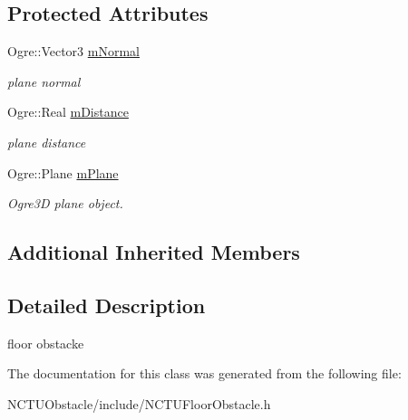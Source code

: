 \subsection*{Protected Attributes}
\begin{DoxyCompactItemize}
\item 
Ogre\+::\+Vector3 \hyperlink{class_n_c_t_u_1_1_floor_obstacle_a1e67d672c9203daf792e43a02892178f}{m\+Normal}\hypertarget{class_n_c_t_u_1_1_floor_obstacle_a1e67d672c9203daf792e43a02892178f}{}\label{class_n_c_t_u_1_1_floor_obstacle_a1e67d672c9203daf792e43a02892178f}

\begin{DoxyCompactList}\small\item\em plane normal \end{DoxyCompactList}\item 
Ogre\+::\+Real \hyperlink{class_n_c_t_u_1_1_floor_obstacle_a6c9b0351b04062bf40001c66296722e7}{m\+Distance}\hypertarget{class_n_c_t_u_1_1_floor_obstacle_a6c9b0351b04062bf40001c66296722e7}{}\label{class_n_c_t_u_1_1_floor_obstacle_a6c9b0351b04062bf40001c66296722e7}

\begin{DoxyCompactList}\small\item\em plane distance \end{DoxyCompactList}\item 
Ogre\+::\+Plane \hyperlink{class_n_c_t_u_1_1_floor_obstacle_adb824abf9f590ee417acbfd7a4f17aaf}{m\+Plane}\hypertarget{class_n_c_t_u_1_1_floor_obstacle_adb824abf9f590ee417acbfd7a4f17aaf}{}\label{class_n_c_t_u_1_1_floor_obstacle_adb824abf9f590ee417acbfd7a4f17aaf}

\begin{DoxyCompactList}\small\item\em Ogre3D plane object. \end{DoxyCompactList}\end{DoxyCompactItemize}
\subsection*{Additional Inherited Members}


\subsection{Detailed Description}
floor obstacke 

The documentation for this class was generated from the following file\+:\begin{DoxyCompactItemize}
\item 
N\+C\+T\+U\+Obstacle/include/N\+C\+T\+U\+Floor\+Obstacle.\+h\end{DoxyCompactItemize}
